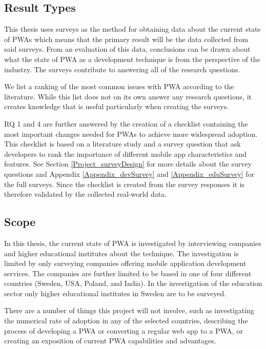 \documentclass[a4paper,12pt]{article}
\begin{document}
\subsection{Result Types}
\label{Intro_results}
This thesis uses surveys as the method for obtaining data about the current state of PWAs which means that the primary result will be the data collected from said surveys. From an evaluation of this data, conclusions can be drawn about what the state of PWA as a development technique is from the perspective of the industry. The surveys contribute to answering all of the research questions.

We list a ranking of the most common issues with PWA according to the literature. While this list does not on its own answer any research questions, it creates knowledge that is useful particularly when creating the surveys.

RQ 1 and 4 are further answered by the creation of a checklist containing the most important changes needed for PWAs to achieve more widespread adoption. This checklist is based on a literature study and a survey question that ask developers to rank the importance of different mobile app characteristics and features. See Section \ref{Project_surveyDesign} for more details about the survey questions and Appendix \ref{Appendix_devSurvey} and \ref{Appendix_eduSurvey} for the full surveys. Since the checklist is created from the survey responses it is therefore validated by the collected real-world data.

\subsection{Scope}
\label{Intro_scope}
In this thesis, the current state of PWA is investigated by interviewing companies and higher educational institutes about the technique. The investigation is limited by only surveying companies offering mobile application development services. The companies are further limited to be based in one of four different countries  (Sweden, USA, Poland, and India). In the investigation of the education sector only higher educational institutes in Sweden are to be surveyed.

There are a number of things this project will not involve, such as investigating the numerical rate of adoption in any of the selected countries, describing the process of developing a PWA or converting a regular web app to a PWA, or creating an exposition of current PWA capabilities and advantages.
\end{document}
